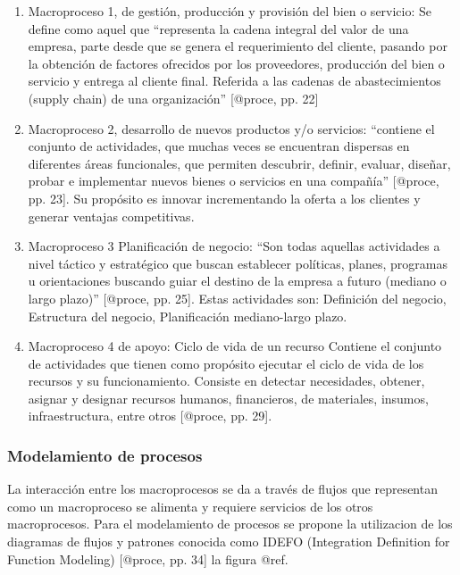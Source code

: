 \documentclass[11pt]{article}
\begin{document}
\begin{enumerate}
\def\labelenumi{\arabic{enumi}.}
\item
  Macroproceso 1, de gestión, producción y provisión del bien o
  servicio: Se define como aquel que ``representa la cadena integral del
  valor de una empresa, parte desde que se genera el requerimiento del
  cliente, pasando por la obtención de factores ofrecidos por los
  proveedores, producción del bien o servicio y entrega al cliente
  final. Referida a las cadenas de abastecimientos (supply chain) de una
  organización'' {[}@proce, pp. 22{]}
\item
  Macroproceso 2, desarrollo de nuevos productos y/o servicios:
  ``contiene el conjunto de actividades, que muchas veces se encuentran
  dispersas en diferentes áreas funcionales, que permiten descubrir,
  definir, evaluar, diseñar, probar e implementar nuevos bienes o
  servicios en una compañía'' {[}@proce, pp. 23{]}. Su propósito es
  innovar incrementando la oferta a los clientes y generar ventajas
  competitivas.
\item
  Macroproceso 3 Planificación de negocio: ``Son todas aquellas
  actividades a nivel táctico y estratégico que buscan establecer
  políticas, planes, programas u orientaciones buscando guiar el destino
  de la empresa a futuro (mediano o largo plazo)'' {[}@proce, pp. 25{]}.
  Estas actividades son: Definición del negocio, Estructura del negocio,
  Planificación mediano-largo plazo.
\item
  Macroproceso 4 de apoyo: Ciclo de vida de un recurso Contiene el
  conjunto de actividades que tienen como propósito ejecutar el ciclo de
  vida de los recursos y su funcionamiento. Consiste en detectar
  necesidades, obtener, asignar y designar recursos humanos,
  financieros, de materiales, insumos, infraestructura, entre otros
  {[}@proce, pp. 29{]}.
\end{enumerate}

\hypertarget{modelamiento-de-procesos}{%
\subsubsection{Modelamiento de
procesos}\label{modelamiento-de-procesos}}

La interacción entre los macroprocesos se da a través de flujos que
representan como un macroproceso se alimenta y requiere servicios de los
otros macroprocesos. Para el modelamiento de procesos se propone la
utilizacion de los diagramas de flujos y patrones conocida como IDEFO
(Integration Definition for Function Modeling) {[}@proce, pp. 34{]} la
figura @ref.
\end{document}
